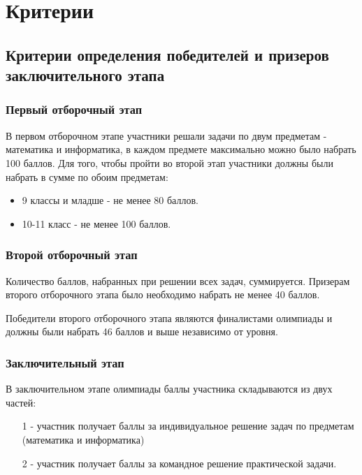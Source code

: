 \part{Критерии}

\chapter{Критерии определения победителей и призеров заключительного этапа}
 
\section{Первый отборочный этап}
 
В первом отборочном этапе участники решали задачи по двум предметам - математика и информатика, в каждом предмете максимально можно было набрать 100 баллов. Для того, чтобы пройти во второй этап участники должны были набрать в сумме по обоим предметам:
\begin{itemize}
    \item 9 классы и младше - не менее 80 баллов.
    \item 10-11 класс - не менее 100 баллов.
\end{itemize}

\section{Второй отборочный этап}

Количество баллов, набранных при решении всех задач, суммируется. Призерам второго отборочного этапа было необходимо набрать не менее 40 баллов.

Победители второго отборочного этапа являются финалистами олимпиады и должны были набрать 46 баллов и выше независимо от уровня.

\section{Заключительный этап}

В заключительном этапе олимпиады баллы участника складываются из двух частей: 
\begin{enumerate}
    \item[1 -] участник получает баллы за индивидуальное решение задач по предметам (математика и информатика)
    \item[2 -] участник получает баллы за командное решение практической задачи.
\end{enumerate} 

